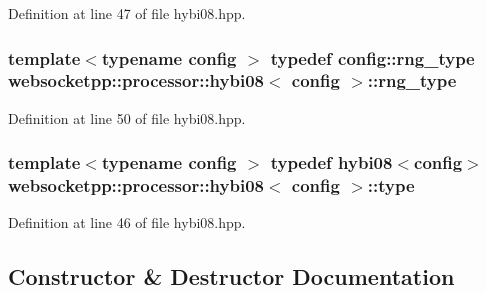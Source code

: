Definition at line 47 of file hybi08.\+hpp.

\hypertarget{classwebsocketpp_1_1processor_1_1hybi08_af8b10cde566c24d29a94f50716fdcddd}{}
\subsubsection[{rng\+\_\+type}]{\setlength{\rightskip}{0pt plus 5cm}template$<$typename config $>$ typedef config\+::rng\+\_\+type {\bf websocketpp\+::processor\+::hybi08}$<$ config $>$\+::{\bf rng\+\_\+type}}\label{classwebsocketpp_1_1processor_1_1hybi08_af8b10cde566c24d29a94f50716fdcddd}


Definition at line 50 of file hybi08.\+hpp.

\hypertarget{classwebsocketpp_1_1processor_1_1hybi08_adb295a175e3c45fad340b974c9daa780}{}
\subsubsection[{type}]{\setlength{\rightskip}{0pt plus 5cm}template$<$typename config $>$ typedef {\bf hybi08}$<$config$>$ {\bf websocketpp\+::processor\+::hybi08}$<$ config $>$\+::{\bf type}}\label{classwebsocketpp_1_1processor_1_1hybi08_adb295a175e3c45fad340b974c9daa780}


Definition at line 46 of file hybi08.\+hpp.



\subsection{Constructor \& Destructor Documentation}
\hypertarget{classwebsocketpp_1_1processor_1_1hybi08_aee51a54933474952a77d7dbe8ce1e06b}{}
